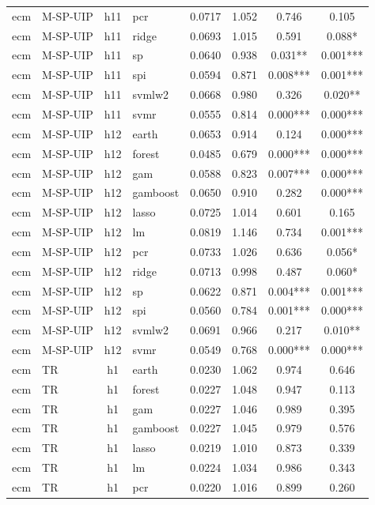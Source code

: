 \begin{ThreePartTable}
\begin{longtable}[t]{llclcccc}
ecm & M-SP-UIP & h11 & pcr & 0.0717 & 1.052 & 0.746 & 0.105\\
ecm & M-SP-UIP & h11 & ridge & 0.0693 & 1.015 & 0.591 & 0.088*\\
ecm & M-SP-UIP & h11 & sp & 0.0640 & 0.938 & 0.031** & 0.001***\\
ecm & M-SP-UIP & h11 & spi & 0.0594 & 0.871 & 0.008*** & 0.001***\\
ecm & M-SP-UIP & h11 & svmlw2 & 0.0668 & 0.980 & 0.326 & 0.020**\\
ecm & M-SP-UIP & h11 & svmr & 0.0555 & 0.814 & 0.000*** & 0.000***\\
\addlinespace
ecm & M-SP-UIP & h12 & earth & 0.0653 & 0.914 & 0.124 & 0.000***\\
ecm & M-SP-UIP & h12 & forest & 0.0485 & 0.679 & 0.000*** & 0.000***\\
ecm & M-SP-UIP & h12 & gam & 0.0588 & 0.823 & 0.007*** & 0.000***\\
ecm & M-SP-UIP & h12 & gamboost & 0.0650 & 0.910 & 0.282 & 0.000***\\
ecm & M-SP-UIP & h12 & lasso & 0.0725 & 1.014 & 0.601 & 0.165\\
ecm & M-SP-UIP & h12 & lm & 0.0819 & 1.146 & 0.734 & 0.001***\\
ecm & M-SP-UIP & h12 & pcr & 0.0733 & 1.026 & 0.636 & 0.056*\\
ecm & M-SP-UIP & h12 & ridge & 0.0713 & 0.998 & 0.487 & 0.060*\\
ecm & M-SP-UIP & h12 & sp & 0.0622 & 0.871 & 0.004*** & 0.001***\\
ecm & M-SP-UIP & h12 & spi & 0.0560 & 0.784 & 0.001*** & 0.000***\\
ecm & M-SP-UIP & h12 & svmlw2 & 0.0691 & 0.966 & 0.217 & 0.010**\\
ecm & M-SP-UIP & h12 & svmr & 0.0549 & 0.768 & 0.000*** & 0.000***\\
\addlinespace
ecm & TR & h1 & earth & 0.0230 & 1.062 & 0.974 & 0.646\\
ecm & TR & h1 & forest & 0.0227 & 1.048 & 0.947 & 0.113\\
ecm & TR & h1 & gam & 0.0227 & 1.046 & 0.989 & 0.395\\
ecm & TR & h1 & gamboost & 0.0227 & 1.045 & 0.979 & 0.576\\
ecm & TR & h1 & lasso & 0.0219 & 1.010 & 0.873 & 0.339\\
ecm & TR & h1 & lm & 0.0224 & 1.034 & 0.986 & 0.343\\
ecm & TR & h1 & pcr & 0.0220 & 1.016 & 0.899 & 0.260\\

\end{longtable}
\end{ThreePartTable}

